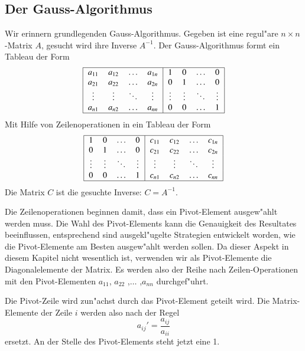 \subsection{Der Gauss-Algorithmus}
Wir erinnern grundlegenden Gauss-Algorithmus. Gegeben ist eine regul"are
$n\times n$-Matrix $A$, gesucht wird ihre Inverse $A^{-1}$.
Der Gauss-Algorithmus formt ein Tableau der Form
\begin{equation}
\begin{tabular}{|>{$}c<{$}>{$}c<{$}>{$}c<{$}>{$}c<{$}|>{$}c<{$}>{$}c<{$}>{$}c<{$}>{$}c<{$}|}
\hline
a_{11}&a_{12}&\dots &a_{1n}&1     &0     &\dots &0\\
a_{21}&a_{22}&\dots &a_{2n}&0     &1     &\dots &0\\
\vdots&\vdots&\ddots&\vdots&\vdots&\vdots&\ddots&\vdots\\
a_{n1}&a_{n2}&\dots &a_{nn}&0     &0     &\dots &1\\
\hline
\end{tabular}
\label{starttableau}
\end{equation}
Mit Hilfe von Zeilenoperationen in ein Tableau der Form
\begin{equation}
\begin{tabular}{|>{$}c<{$}>{$}c<{$}>{$}c<{$}>{$}c<{$}|>{$}c<{$}>{$}c<{$}>{$}c<{$}>{$}c<{$}|}
\hline
1     &0     &\dots &0     & c_{11}&c_{12}&\dots &c_{1n}\\
0     &1     &\dots &0     & c_{21}&c_{22}&\dots &c_{2n}\\
\vdots&\vdots&\ddots&\vdots& \vdots&\vdots&\ddots&\vdots\\
0     &0     &\dots &1     & c_{n1}&c_{n2}&\dots &c_{nn}\\
\hline
\end{tabular}
\label{targettableau}
\end{equation}
Die Matrix $C$ ist die gesuchte Inverse: $C=A^{-1}$.

Die Zeilenoperationen beginnen damit, dass ein Pivot-Element ausgew"ahlt
werden muss.
Die Wahl des Pivot-Elements kann die Genauigkeit des Resultates beeinflussen,
entsprechend sind ausgekl"ugelte Strategien entwickelt worden, wie die
Pivot-Elemente am Besten ausgew"ahlt werden sollen. Da dieser Aspekt in
diesem Kapitel nicht wesentlich ist, verwenden wir als Pivot-Elemente die
Diagonalelemente der Matrix. Es werden also der Reihe nach Zeilen-Operationen
mit den Pivot-Elementen $a_{11}$, $a_{22}$ ,$\dots$ ,$a_{nn}$ 
durchgef"uhrt.

Die Pivot-Zeile wird zun"achst durch das
Pivot-Element geteilt wird. Die Matrix-Elemente der Zeile $i$ werden
also nach der Regel
\begin{equation}
a_{ij}'=\frac{a_{ij}}{a_{ii}}
\label{red}
\end{equation}
ersetzt.
An der Stelle des Pivot-Elements steht jetzt eine 1.

